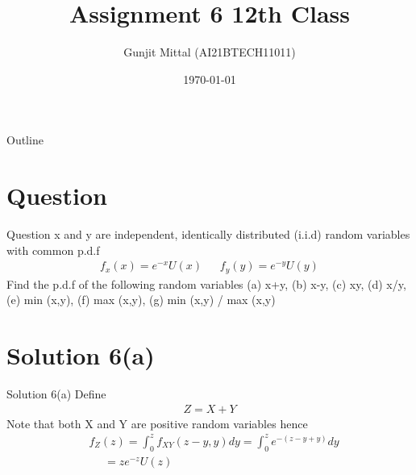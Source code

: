 \documentclass{beamer}
\title{Assignment 6 12th Class}
\author{Gunjit Mittal (AI21BTECH11011)}
\date{\today}
\providecommand{\brak}[1]{\ensuremath{\left(#1\right)}}
\theoremstyle{remark}
\numberwithin{equation}{section}
\numberwithin{figure}{section}
\numberwithin{table}{section}
\begin{document}
 
\begin{frame}
  \titlepage{}
\end{frame}
\logo{}
\begin{frame}{Outline}
  \tableofcontents
\end{frame}
\section{Question}
\begin{frame}{Question}
x and y are independent, identically distributed (i.i.d) random variables with common p.d.f
\begin{align*}
    f_x\brak{x} = e^{-x}U\brak{x}~~~~~~~f_y\brak{y} = e^{-y}U\brak{y}
\end{align*}
Find the p.d.f of the following random variables (a) x+y, (b) x-y, (c) xy, (d) x/y, (e) min (x,y), (f) max (x,y), (g) min (x,y) / max (x,y)
\end{frame}
\section{Solution 6(a)} 
\begin{frame}{Solution 6(a)}
Define 
\begin{align}
  Z = X + Y
\end{align}
Note that both X and Y are positive random variables hence 
\begin{align}
  &f_Z\brak{z} = \int_{0}^{z} f_{XY}\brak{z-y,y}dy = \int_0^z e^{-\brak{z-y+y}}dy\\
 &~~~~~~= ze^{-z}U\brak{z}
\end{align}
\end{frame}
\end{document}
